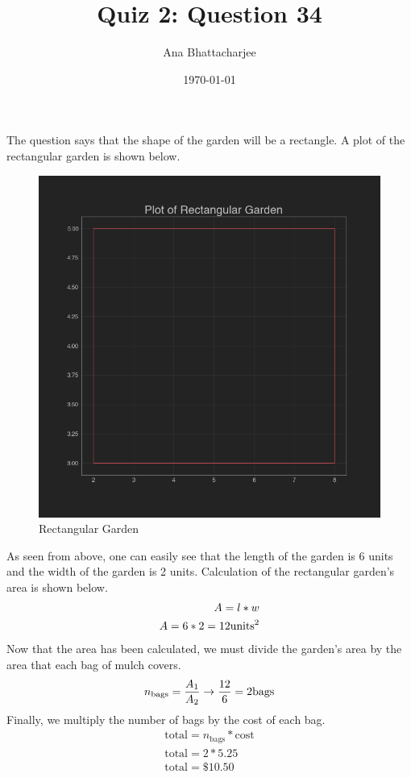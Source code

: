 \documentclass{article}
\begin{document}
\author{Ana Bhattacharjee}
\title{Quiz 2: Question 34}
\date{\today}
\maketitle{}

\begin{center}
The question says that the shape of the garden will be a rectangle. A plot of the rectangular garden is shown below.
\begin{figure}
  \includegraphics[width=1.2\columnwidth]{../../../../../../math/Anna/geometry/coordinate_geometry/quiz2/q34/rectangular_garden}
  \caption{Rectangular Garden}
\end{figure}
\par
As seen from above, one can easily see that the length of the garden is 6 units and the width of the garden is 2 units. Calculation of the rectangular garden's area is shown below.
\begin{align}
  A = l * w \\
  A = 6 * 2 = 12 \vspace{1cm} \text{units}^2
\end{align}
Now that the area has been calculated, we must divide the garden's area by the area that each bag of mulch covers.
\begin{align}
  n_{\text{bags}} = \frac{A_1}{A_2} \rightarrow \frac{12}{6} = 2 \vspace{1cm} \text{bags} \\
\end{align}
Finally, we multiply the number of bags by the cost of each bag.
\begin{align}
  \text{total} = n_{\text{bags}} * \text{cost} \\
  \text{total} = 2 * 5.25 \\
  \text{total} = \$ 10.50
\end{align}
\end{center}
\end{document}
